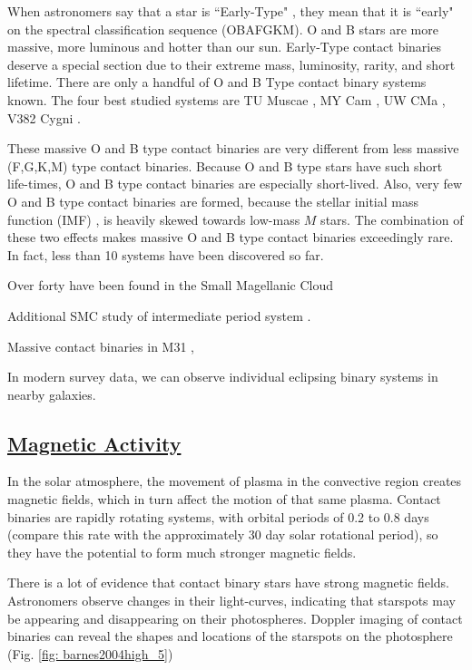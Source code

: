 \documentclass[12pt]{article} %
\numberwithin{equation}{section} %
\begin{document}
When astronomers say that a star is ``Early-Type" , they mean that it is ``early" on the spectral classification sequence (OBAFGKM). O and B stars are more massive, more luminous and hotter than our sun. Early-Type contact binaries deserve a special section due to their extreme mass, luminosity, rarity, and short lifetime. There are only a handful of O and B Type contact binary systems known. The four best studied systems are TU Muscae \citep{penny2008tomographic}, MY Cam \citep{lorenzo2014my}, UW CMa \citep{antokhina2011light}, V382 Cygni \citep{popper1978masses}. 

These massive O and B type contact binaries are very different from less massive (F,G,K,M) type contact binaries. Because O and B type stars have such short life-times, O and B type contact binaries are especially short-lived. Also, very few O and B type contact binaries are formed, because the stellar initial mass function (IMF) , is heavily skewed towards low-mass $M$ stars. The combination of these two effects makes massive O and B type contact binaries exceedingly rare. In fact, less than 10 systems have been discovered so far.

Over forty have been found in the Small Magellanic Cloud \citep{hilditch2005forty} 

Additional SMC study of intermediate period system \citep{priya2013photometric}.

Massive contact binaries in M31 \citep{lee2014properties}, \citep{vilardell2006eclipsing}

In modern survey data, we can observe individual eclipsing binary systems in nearby galaxies.


\subsection[Magnetic Activity]{\hyperlink{toc}{Magnetic Activity}}

In the solar atmosphere, the movement of plasma in the convective region creates magnetic fields, which in turn affect the motion of that same plasma. Contact binaries are rapidly rotating systems, with orbital periods of 0.2 to 0.8 days (compare this rate with the approximately 30 day solar rotational period), so they have the potential to form much stronger magnetic fields.

There is a lot of evidence that contact binary stars have strong magnetic fields. Astronomers observe changes in their light-curves, indicating that starspots may be appearing and disappearing on their photospheres. Doppler imaging of contact binaries can reveal the shapes and locations of the starspots on the photosphere (Fig. \ref{fig: barnes2004high_5})
\end{document}
